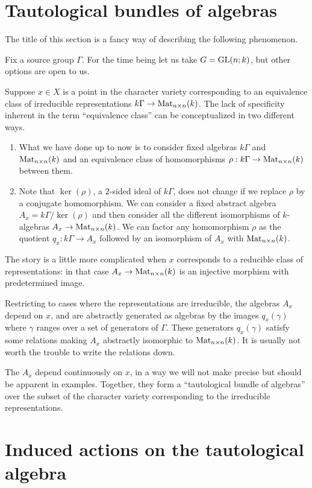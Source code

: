\documentclass[11pt, oneside, usenames, dvipsnames, svgnames, table, final]{amsart}
\begin{document}
\section{Tautological bundles of algebras}
\label{sec:taut-bundl-algebr}

The title of this section is a fancy way of describing the following phenomenon.

Fix a source group $\Gamma$. For the time being let us take $G = \operatorname{GL}(n; k)$, but other options
are open to us.

Suppose $x \in X$ is a point in the character variety corresponding to an equivalence class of irreducible
representations $k \Gamma \to \operatorname{Mat}_{n \times n}(k)$. The lack of specificity inherent in the term ``equivalence class''
can be conceptualized in two different ways.
\begin{enumerate}
\item What we have done up to now is to consider fixed algebras $k \Gamma$ and $\operatorname{Mat}_{n \times n}(k)$ and an equivalence
  class of homomorphisms $\rho : k \Gamma \to \operatorname{Mat}_{n \times n}(k)$ between them.
\item Note that $\ker(\rho)$, a $2$-sided ideal of $k \Gamma$, does not change if we replace $\rho$ by a conjugate
  homomorphism. We can consider a fixed abstract algebra $A_x = k \Gamma / \ker(\rho)$ and then consider all the
  different isomorphisms of $k$-algebras $A_x \to \operatorname{Mat}_{n \times n}(k)$. We can factor any homomorphism $\rho$
  as the quotient $q_x : k \Gamma \to A_x$ followed by an isomorphism of $A_x$ with $\operatorname{Mat}_{n \times n}(k)$.
\end{enumerate}

\begin{remark}
  The story is a little more complicated when $x$ corresponds to a reducible class of representations: in that case
  $A_x \to \operatorname{Mat}_{n \times n}(k)$ is an injective morphism with predetermined image.
\end{remark}

Restricting to cases where the representations are irreducible, the algebras $A_x$ depend on $x$, and are abstractly
generated as algebras by the images $q_x(\gamma)$ where $\gamma$ ranges over a set of generators of  $\Gamma$. These
generators $q_x(\gamma)$ satisfy some relations making $A_x$ abstractly isomorphic to $\operatorname{Mat}_{n \times n}(k)$. It is
usually not worth the trouble to write the relations down.

The $A_x$ depend continuously on $x$, in a way we will not make precise but should be apparent in examples. Together,
they form a ``tautological bundle of algebras'' over the subset of the character variety corresponding to the
irreducible representations.



\section{Induced actions on the tautological algebra}







\printbibliography


 
\end{document}
